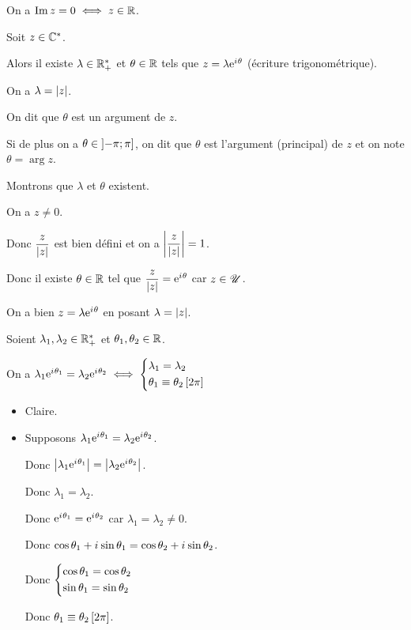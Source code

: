 \begin{rem}
On a \(\operatorname{Im} z=0\iff z\in\mathbb{R}\).
\end{rem}

\begin{defprop}
Soit \(z\in\mathbb{C}^*\).

Alors il existe \(\lambda\in\mathbb{R}_+^*\) et \(\theta\in\mathbb{R}\) tels que \(z=\lambda\mathrm{e}^{i\mkern1mu\theta}\) (écriture trigonométrique).

On a \(\lambda=\left\lvert z\right\rvert\).

On dit que \(\theta\) est un argument de \(z\).

Si de plus on a \(\theta\in\left]-\pi;\pi\right]\), on dit que \(\theta\) est l'argument (principal) de \(z\) et on note \(\theta=\arg z\).
\end{defprop}

\begin{dem}
Montrons que \(\lambda\) et \(\theta\) existent.

On a \(z\not=0\).

Donc \(\dfrac{z}{\left\lvert z\right\rvert}\) est bien défini et on a \(\left\lvert\dfrac{z}{\left\lvert z\right\rvert}\right\rvert=1\).

Donc il existe \(\theta\in\mathbb{R}\) tel que \(\dfrac{z}{\left\lvert z\right\rvert}=\mathrm{e}^{i\mkern1mu\theta}\) car \(z\in\mathscr{U}\).

On a bien \(z=\lambda\mathrm{e}^{i\mkern1mu\theta}\) en posant \(\lambda=\left\lvert z\right\rvert\).
\end{dem}

\begin{rem}
Soient \(\lambda_1,\lambda_2\in\mathbb{R}_+^*\) et \(\theta_1,\theta_2\in\mathbb{R}\).

On a \(\lambda_1\mathrm{e}^{i\mkern1mu\theta_1}=\lambda_2\mathrm{e}^{i\mkern1mu\theta_2}\iff\begin{dcases}\lambda_1=\lambda_2 \\ \theta_1\equiv\theta_2\left[2\pi\right]\end{dcases}\)
\end{rem}

\begin{dem}
\begin{itemize}
\item[\imprec] Claire.

\item[\impdir] Supposons \(\lambda_1\mathrm{e}^{i\mkern1mu\theta_1}=\lambda_2\mathrm{e}^{i\mkern1mu\theta_2}\).

Donc \(\left\lvert\lambda_1\mathrm{e}^{i\mkern1mu\theta_1}\right\rvert=\left\lvert\lambda_2\mathrm{e}^{i\mkern1mu\theta_2}\right\rvert\).

Donc \(\lambda_1=\lambda_2\).

Donc \(\mathrm{e}^{i\mkern1mu\theta_1}=\mathrm{e}^{i\mkern1mu\theta_2}\) car \(\lambda_1=\lambda_2\not=0\).

Donc \(\cos\theta_1+i\mkern1mu\sin\theta_1=\cos\theta_2+i\mkern1mu\sin\theta_2\).

Donc \(\begin{dcases}\cos\theta_1=\cos\theta_2 \\ \sin\theta_1=\sin\theta_2\end{dcases}\)

Donc \(\theta_1\equiv\theta_2\left[2\pi\right]\).
\end{itemize}
\end{dem}

